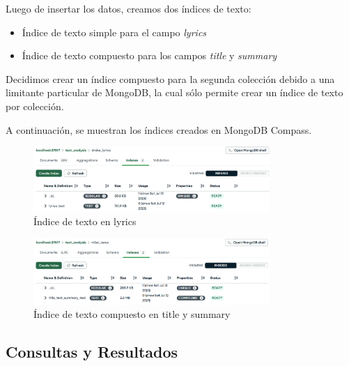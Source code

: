 Luego de insertar los datos, creamos dos índices de texto:

\begin{itemize}
    \item Índice de texto simple para el campo \textit{lyrics}
    \item Índice de texto compuesto para los campos \textit{title} y \textit{summary}
\end{itemize}

Decidimos crear un índice compuesto para la segunda colección debido a una limitante particular
de MongoDB, la cual sólo permite crear un índice de texto por colección.

A continuación, se muestran los índices creados en MongoDB Compass.

\begin{figure}[H]
    \centering
    \includegraphics[width=0.8\textwidth]{./indices_drake.png}
    \caption{Índice de texto en lyrics}\label{fig:indicesdrake}
\end{figure}

\begin{figure}[H]
    \centering
    \includegraphics[width=0.8\textwidth]{./indices_milei.png}
    \caption{Índice de texto compuesto en title y summary}\label{fig:indicesmilei}
\end{figure}

\subsection{Consultas y Resultados}